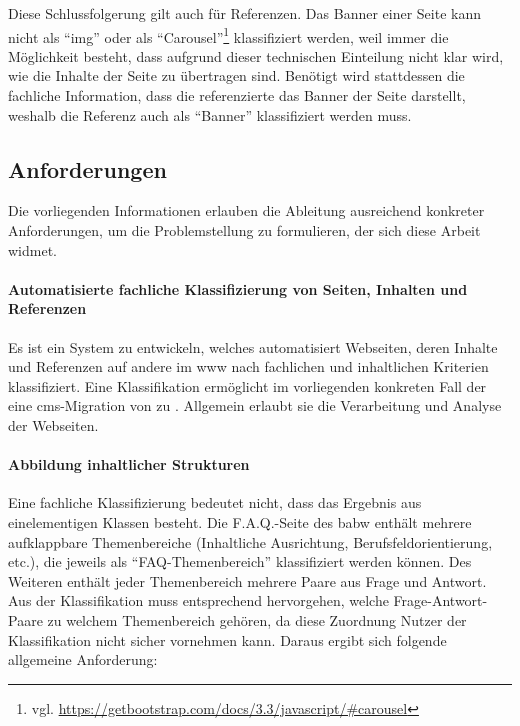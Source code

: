         Diese Schlussfolgerung gilt auch für Referenzen.
        Das Banner einer Seite kann nicht als "`img"'
        oder als "`Carousel"'\footnote{vgl. \url{https://getbootstrap.com/docs/3.3/javascript/\#carousel}}
        klassifiziert werden, weil immer die Möglichkeit besteht,
        dass aufgrund dieser technischen Einteilung nicht klar wird,
        wie die Inhalte der Seite zu übertragen sind.
        Benötigt wird stattdessen die fachliche Information,
        dass die referenzierte {\resource} das Banner der Seite darstellt,
        weshalb die Referenz auch als "`Banner"' klassifiziert werden muss.

    \subsection{Anforderungen}
        Die vorliegenden Informationen erlauben
        die Ableitung ausreichend konkreter Anforderungen,
        um die Problemstellung zu formulieren, der sich diese Arbeit widmet.

        \paragraph*{Automatisierte fachliche Klassifizierung von Seiten, Inhalten und Referenzen}
        Es ist ein System zu entwickeln, welches automatisiert Webseiten,
        deren Inhalte und Referenzen auf andere {\resources} im \gls{www}
        nach fachlichen und inhaltlichen Kriterien klassifiziert.
        Eine Klassifikation ermöglicht im vorliegenden konkreten Fall
        der {\fernUni} eine \gls{cms}-Migration von {\wordpress} zu {\imperia}.
        Allgemein erlaubt sie die Verarbeitung und Analyse der Webseiten.

        \paragraph*{Abbildung inhaltlicher Strukturen}
        Eine fachliche Klassifizierung bedeutet nicht,
        dass das Ergebnis aus einelementigen Klassen besteht.
        Die F.A.Q.-Seite des \gls{babw} enthält mehrere aufklappbare
        Themenbereiche (Inhaltliche Ausrichtung, Berufsfeldorientierung, etc.),
        die jeweils als "`FAQ-Themenbereich"' klassifiziert werden können.
        Des Weiteren enthält jeder Themenbereich mehrere Paare aus Frage und Antwort.
        Aus der Klassifikation muss entsprechend hervorgehen,
        welche Frage-Antwort-Paare zu welchem Themenbereich gehören,
        da diese Zuordnung Nutzer der Klassifikation nicht sicher vornehmen kann.
        Daraus ergibt sich folgende allgemeine Anforderung:

